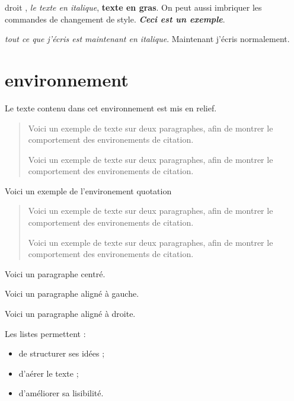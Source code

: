 \documentclass[a4paper,11pt]{article}
\begin{document}
\textup{droit} , \textit{le texte en italique}, \textbf{texte en gras}.
On peut aussi imbriquer les commandes de changement de style. \textit{\textbf{Ceci est un exemple}}.

{\itshape tout ce que j'écris est maintenant en italique}. Maintenant j'écris normalement.

\section{environnement}

\begin{em}
Le texte contenu dans cet environnement est mis en relief.
\end{em}

\begin{quote}
Voici un exemple de texte sur deux paragraphes, afin de montrer le comportement des environements de citation.

Voici un exemple de texte sur deux paragraphes, afin de montrer le comportement des environements de citation.
\end{quote}

Voici un exemple de l'environement quotation


\begin{quotation}
Voici un exemple de texte sur deux paragraphes, afin de montrer le comportement des environements de citation.

Voici un exemple de texte sur deux paragraphes, afin de montrer le comportement des environements de citation.
\end{quotation}

\begin{center}
Voici un paragraphe centré.
\end{center}

\begin{flushleft}
Voici un paragraphe aligné à gauche.
\end{flushleft}

\begin{flushright}
Voici un paragraphe aligné à droite.
\end{flushright}

Les listes permettent :
\begin{itemize}

\item de structurer ses idées ;

\item d'aérer le texte ;

\item d'améliorer sa lisibilité.

\end{itemize}
\end{document}
